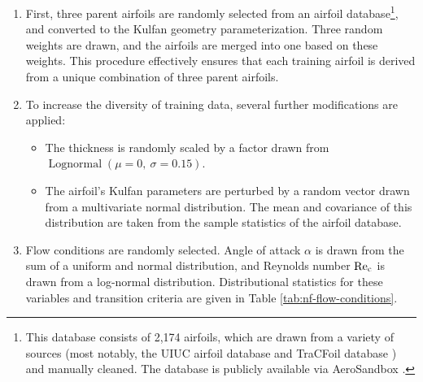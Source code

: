    \begin{enumerate}
        \item First, three parent airfoils are randomly selected from an airfoil database\footnote{This database consists of 2,174 airfoils, which are drawn from a variety of sources (most notably, the UIUC airfoil database \cite{uiuc_airfoil_database} and TraCFoil database \cite{etiemble_tracfoil_2023}) and manually cleaned. The database is publicly available via AeroSandbox \cite{sharpe_aerosandbox_2021}.}, and converted to the Kulfan geometry parameterization. Three random weights are drawn, and the airfoils are merged into one based on these weights. This procedure effectively ensures that each training airfoil is derived from a unique combination of three parent airfoils.
        \item To increase the diversity of training data, several further modifications are applied:
        \begin{itemize}
            \item The thickness is randomly scaled by a factor drawn from $\operatorname{Lognormal}(\mu=0,\ \sigma=0.15)$.
            \item The airfoil's Kulfan parameters are perturbed by a random vector drawn from a multivariate normal distribution. The mean and covariance of this distribution are taken from the sample statistics of the airfoil database.
        \end{itemize}
        \item Flow conditions are randomly selected. Angle of attack $\alpha$ is drawn from the sum of a uniform and normal distribution, and Reynolds number $\rm Re_c$ is drawn from a log-normal distribution. Distributional statistics for these variables and transition criteria are given in Table \ref{tab:nf-flow-conditions}.
    \end{enumerate}

